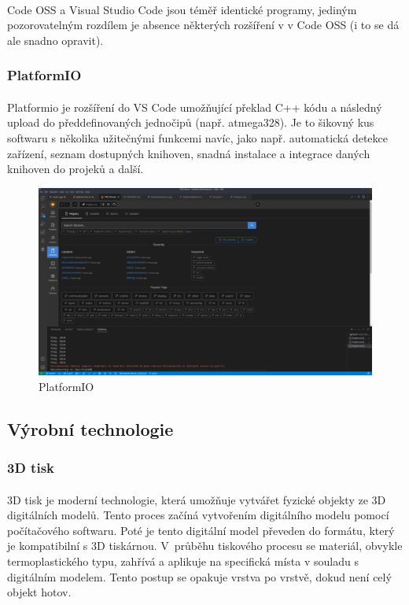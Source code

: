 \documentclass[12pt]{article}
\begin{document}
\begin{spacing}{1.5}
	\paragraph{} Code OSS a Visual Studio Code jsou téměř identické programy, jediným pozorovatelným rozdílem je absence některých rozšíření v  v Code OSS (i to se dá ale snadno opravit).
	
	\subsubsection*{PlatformIO}
	\paragraph{} Platformio je rozšíření do VS Code umožňující překlad C++ kódu a následný upload do předdefinovaných jednočipů (např. atmega328). Je to šikovný kus softwaru s několika užitečnými funkcemi navíc, jako např. automatická detekce zařízení, seznam dostupných knihoven, snadná instalace a integrace daných knihoven do projeků a další.
	
	\begin{figure}[H]
		\centering
		\includegraphics[width=\linewidth]{platformio}
		\caption{PlatformIO}
		\label{fig:platformio}
	\end{figure}
	
	\newpage
	\subsection{Výrobní technologie}
	\subsubsection{3D tisk}
	\paragraph{} 3D tisk je moderní technologie, která umožňuje vytvářet fyzické objekty ze 3D digitálních modelů. Tento proces začíná vytvořením digitálního modelu pomocí počítačového softwaru. Poté je tento digitální model převeden do formátu, který je kompatibilní s 3D tiskárnou. V~průběhu tiskového procesu se materiál, obvykle termoplastického typu, zahřívá a aplikuje na specifická místa v souladu s digitálním modelem. Tento postup se opakuje vrstva po vrstvě, dokud není celý objekt hotov.
	

\end{spacing}
\end{document}
